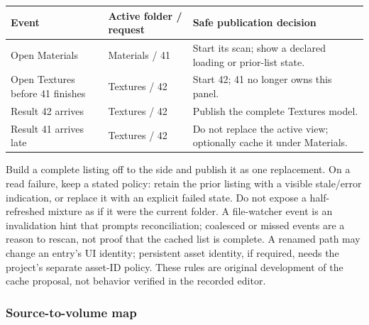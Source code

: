 {\def\LTcaptype{none} %
\begin{longtable}[]{@{}
  >{\raggedright\arraybackslash}p{}
  >{\raggedright\arraybackslash}p{}
  >{\raggedright\arraybackslash}p{}@{}}
\toprule\noalign{}
\begin{minipage}[b]{\linewidth}\raggedright
Event
\end{minipage} & \begin{minipage}[b]{\linewidth}\raggedright
Active folder / request
\end{minipage} & \begin{minipage}[b]{\linewidth}\raggedright
Safe publication decision
\end{minipage} \\
\midrule\noalign{}
\endhead
\bottomrule\noalign{}
\endlastfoot
Open Materials & Materials / 41 & Start its scan; show a declared loading or prior-list state. \\
Open Textures before 41 finishes & Textures / 42 & Start 42; 41 no longer owns this panel. \\
Result 42 arrives & Textures / 42 & Publish the complete Textures model. \\
Result 41 arrives late & Textures / 42 & Do not replace the active view; optionally cache it under Materials. \\
\end{longtable}
}

Build a complete listing off to the side and publish it as one replacement. On a read failure, keep a stated policy: retain the prior listing with a visible stale/error indication, or replace it with an explicit failed state. Do not expose a half-refreshed mixture as if it were the current folder. A file-watcher event is an invalidation hint that prompts reconciliation; coalesced or missed events are a reason to rescan, not proof that the cached list is complete. A renamed path may change an entry's UI identity; persistent asset identity, if required, needs the project's separate asset-ID policy. These rules are original development of the cache proposal, not behavior verified in the recorded editor.

\subsubsection{Source-to-volume map}\label{06-engine-ii-ch027-source-to-volume-map}

